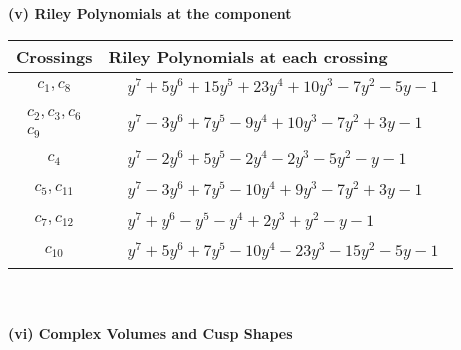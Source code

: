 \documentclass[1p]{elsarticle_modified}
\theoremstyle{definition}
\begin{document}
\newpage\renewcommand{\arraystretch}{1}
\flushleft \textbf{(v) Riley Polynomials at the component}\newline \\
\begin{tabular}{m{50pt}|m{274pt}}
Crossings & \hspace{64pt}Riley Polynomials at each crossing \\
\hline $$\begin{aligned}c_{1},c_{8}\end{aligned}$$&$\begin{aligned}
&y^7+5 y^6+15 y^5+23 y^4+10 y^3-7 y^2-5 y-1
\end{aligned}$\\
\hline $$\begin{aligned}c_{2},c_{3},c_{6}\\c_{9}\end{aligned}$$&$\begin{aligned}
&y^7-3 y^6+7 y^5-9 y^4+10 y^3-7 y^2+3 y-1
\end{aligned}$\\
\hline $$\begin{aligned}c_{4}\end{aligned}$$&$\begin{aligned}
&y^7-2 y^6+5 y^5-2 y^4-2 y^3-5 y^2- y-1
\end{aligned}$\\
\hline $$\begin{aligned}c_{5},c_{11}\end{aligned}$$&$\begin{aligned}
&y^7-3 y^6+7 y^5-10 y^4+9 y^3-7 y^2+3 y-1
\end{aligned}$\\
\hline $$\begin{aligned}c_{7},c_{12}\end{aligned}$$&$\begin{aligned}
&y^7+y^6- y^5- y^4+2 y^3+y^2- y-1
\end{aligned}$\\
\hline $$\begin{aligned}c_{10}\end{aligned}$$&$\begin{aligned}
&y^7+5 y^6+7 y^5-10 y^4-23 y^3-15 y^2-5 y-1
\end{aligned}$\\
\hline
\end{tabular}\\~\\
\newpage\flushleft \textbf{(vi) Complex Volumes and Cusp Shapes}
\end{document}
